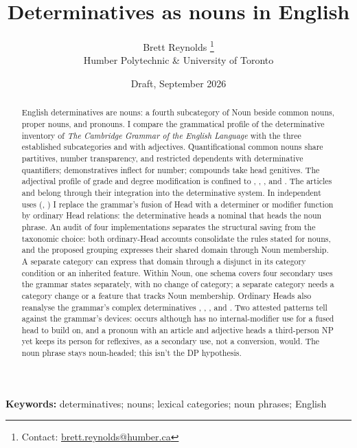 \documentclass[12pt]{article}
\title{Determinatives as nouns in English}
\author{Brett Reynolds \orcidlink{0000-0003-0073-7195}%
\thanks{Contact: \href{mailto:brett.reynolds@humber.ca}{brett.reynolds@humber.ca}}\\
Humber Polytechnic \& University of Toronto}
\date{Draft, September 2026}
\begin{document}
\maketitle

\begin{abstract}
English determinatives are nouns: a fourth subcategory of Noun beside common nouns, proper nouns, and pronouns. I compare the grammatical profile of the determinative inventory of \textit{The Cambridge Grammar of the English Language} with the three established subcategories and with adjectives. Quantificational common nouns share partitives, number transparency, and restricted dependents with determinative quantifiers; demonstratives inflect for number; compounds take head genitives. The adjectival profile of grade and degree modification is confined to , , , and . The articles and  belong through their integration into the determinative system. In independent uses (, ) I replace the grammar's fusion of Head with a determiner or modifier function by ordinary Head relations: the determinative heads a nominal that heads the noun phrase. An audit of four implementations separates the structural saving from the taxonomic choice: both ordinary-Head accounts consolidate the rules stated for nouns, and the proposed grouping expresses their shared domain through Noun membership. A separate category can express that domain through a disjunct in its category condition or an inherited feature. Within Noun, one schema covers four secondary uses the grammar states separately, with no change of category; a separate category needs a category change or a feature that tracks Noun membership. Ordinary Heads also reanalyse the grammar's complex determinatives , , , and . Two attested patterns tell against the grammar's devices:  occurs although  has no internal-modifier use for a fused head to build on, and a pronoun with an article and adjective heads a third-person NP yet keeps its person for reflexives, as a secondary use, not a conversion, would. The noun phrase stays noun-headed; this isn't the DP hypothesis.
\end{abstract}

\noindent\textbf{Keywords:} determinatives; nouns; lexical categories; noun phrases; English

\par\medskip
{}
\medskip
\end{document}
